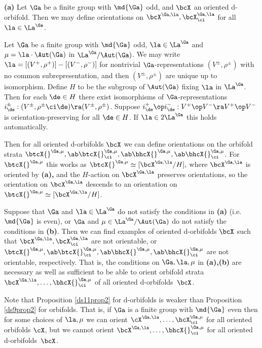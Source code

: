 \documentclass{article}
\begin{document}
\begin{prop}{\bf(a)} Let\/ $\Ga$ be a finite group with\/
$\md{\Ga}$ odd, and\/ $\bcX$ an oriented d-orbifold. Then we may
define orientations on $\bcX^{\Ga,\la},\bcX^{\Ga,\la}_\ci$ for
all\/~$\la\in\La^\Ga$.
\smallskip

 Let\/ $\Ga$ be a finite group with\/ $\md{\Ga}$
odd, $\la\in\La^\Ga$ and\/ $\mu=\la\cdot\Aut(\Ga)$ in $\La^\Ga/
\Aut(\Ga)$. We may write $\la=[(V^+,\rho^+)]-[(V^-,\rho^-)]$ for
nontrivial $\Ga$-representations $(V^\pm,\rho^\pm)$ with no common
subrepresentation, and then\/ $(V^\pm,\rho^\pm)$ are unique up to
isomorphism. Define $H$ to be the subgroup of\/ $\Aut(\Ga)$ fixing\/
$\la$ in\/ $\La^\Ga$. Then for each\/ $\de\in H$ there exist
isomorphisms of\/ $\Ga$-representations
$i_\de^\pm:(V^\pm,\rho^\pm\ci\de) \ra(V^\pm,\rho^\pm)$. Suppose
$i_\de^+\op i_\de^-:V^+\op V^-\ra V^+\op V^-$ is
orientation-preserving for all\/ $\de\in H$. If\/ $\la\in 2\La^\Ga$
this holds automatically.

Then for all oriented d-orbifolds\/ $\bcX$ we can define
orientations on the orbifold strata\/ $\btcX{}^{\Ga,\mu},
\ab\btcX{}^{\Ga,\mu}_\ci,\ab
\bhcX{}^{\Ga,\mu},\ab\bhcX{}^{\Ga,\mu}_\ci$. For $\btcX{}^{\Ga,\mu}$
this works as\/ $\btcX{}^{\Ga,\mu}\simeq [\bcX^{\Ga,\la}/H],$ where
$\bcX^{\Ga,\la}$ is oriented by {\bf(a)\rm,} and the $H$-action on
$\bcX^{\Ga,\la}$ preserves orientations, so the orientation on
$\bcX^{\Ga,\la}$ descends to an orientation
on\/~$\btcX{}^{\Ga,\mu}\simeq [\bcX^{\Ga,\la}/H]$.
\smallskip

 Suppose that\/ $\Ga$ and\/ $\la\in\La^\Ga$ do not
satisfy the conditions in {\bf(a)} (i.e.\ $\md{\Ga}$ is even), or\/
$\Ga$ and\/ $\mu\in\La^\Ga/\Aut(\Ga)$ do not satisfy the conditions
in {\bf(b)}. Then we can find examples of oriented d-orbifolds\/
$\bcX$ such that\/ $\bcX^{\Ga,\la},\bcX^{\Ga,\la}_\ci$ are not
orientable, or $\btcX{}^{\Ga,\mu}, \ab\btcX{}^{\Ga,\mu}_\ci,\ab
\bhcX{}^{\Ga,\mu},\ab\bhcX{}^{\Ga,\mu}_\ci$ are not orientable,
respectively. That is, the conditions on $\Ga,\la,\mu$ in
{\bf(a)\rm,\bf(b)} are necessary as well as sufficient to be able to
orient orbifold strata\/ $\bcX^{\Ga,\la},\ldots,
\bhcX{}^{\Ga,\mu}_\ci$ of all oriented d-orbifolds\/~$\bcX$.
\label{ds11prop2}
\end{prop}

Note that Proposition \ref{ds11prop2} for d-orbifolds is weaker than
Proposition \ref{ds9prop2} for orbifolds. That is, if $\Ga$ is a
finite group with $\md{\Ga}$ even then for some choices of $\la,\mu$
we can orient $\cX^{\Ga,\la},\ldots,\hcX^{\Ga,\mu}_\ci$ for all
oriented orbifolds $\cX$, but we cannot orient $\bcX^{\Ga,\la},
\ldots,\bhcX{}^{\Ga,\mu}_\ci$ for all oriented
d-orbifolds~$\bcX$.
\end{document}
